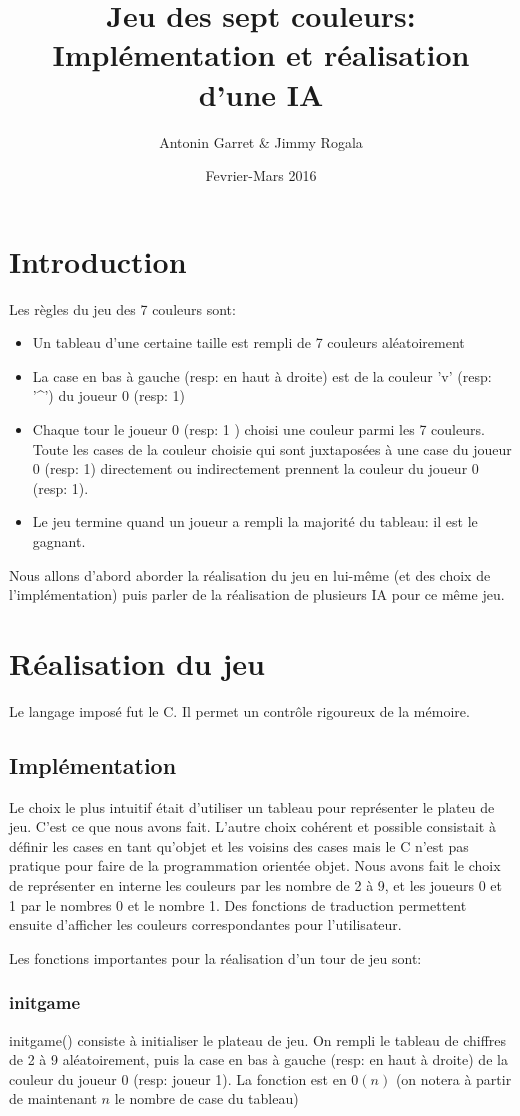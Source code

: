\documentclass[11pt]{article}
\title{Jeu des sept couleurs: Implémentation et réalisation d'une IA}
\author{Antonin Garret & Jimmy Rogala}
\date{Fevrier-Mars 2016}
\begin{document}
  \maketitle
  \section*{Introduction}
    Les règles du jeu des 7 couleurs sont:
    \begin{itemize} %
      \item Un tableau d'une certaine taille est rempli de 7 couleurs aléatoirement
      \item La case en bas à gauche (resp: en haut à droite) est de la couleur 'v' (resp: '^') du joueur 0 (resp: 1)
      \item Chaque tour le joueur 0 (resp: 1 ) choisi une couleur parmi les 7 couleurs. Toute les cases de la couleur choisie qui sont juxtaposées à une case du joueur 0 (resp: 1) directement ou indirectement prennent la couleur du joueur 0 (resp: 1).
      \item Le jeu termine quand un joueur a rempli la majorité du tableau: il est le gagnant.
    \end{itemize}
    Nous allons d'abord aborder la réalisation du jeu en lui-même (et des choix de l'implémentation) puis parler de la réalisation de plusieurs IA pour ce même jeu.
  \section{Réalisation du jeu}
    Le langage imposé fut le C. Il permet un contrôle rigoureux de la mémoire.
    \subsection{Implémentation}
      Le choix le plus intuitif était d'utiliser un tableau pour représenter le plateu de jeu. C'est ce que nous avons fait. L'autre choix cohérent et possible consistait à définir les cases en tant qu'objet et les voisins des cases mais le C n'est pas pratique pour faire de la programmation orientée objet.
      Nous avons fait le choix de représenter en interne les couleurs par les nombre de 2 à 9, et les joueurs 0 et 1 par le nombres 0 et le nombre 1. Des fonctions de traduction permettent ensuite d'afficher les couleurs correspondantes pour l'utilisateur.

      Les fonctions importantes pour la réalisation d'un tour de jeu sont:
      \subsubsection{initgame}
        initgame() consiste à initialiser le plateau de jeu. On rempli le tableau de chiffres de 2 à 9 aléatoirement, puis la case en bas à gauche (resp: en haut à droite) de la couleur du joueur 0 (resp: joueur 1). La fonction est en $0(n)$ (on notera à partir de maintenant $n$ le nombre de case du tableau)
\end{document}
